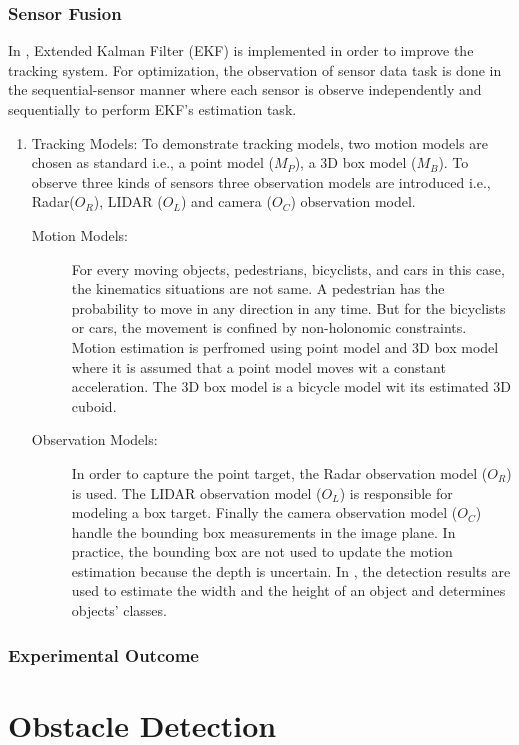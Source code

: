 \subsubsection{Sensor Fusion}
In \cite{Cho_2014}, Extended Kalman Filter (EKF) is implemented in order to improve the tracking system. For optimization, the observation of sensor data task is done in the sequential-sensor manner where each sensor is observe independently and sequentially to perform EKF’s estimation task.
\begin{enumerate}[label=\Alph*]
    \item Tracking Models: To demonstrate tracking models, two motion models are chosen as standard i.e., a point model ($M_{P}$), a 3D box model ($M_{B}$). To observe three kinds of sensors three observation models are introduced i.e., Radar($O_{R}$), LIDAR ($O_{L}$) and camera ($O_{C}$) observation model.
    \begin{description}
        \item[Motion Models:] For every moving objects, pedestrians, bicyclists, and cars in this case, the kinematics situations are not same. A pedestrian has the probability to move in any direction in any time. But for the bicyclists or cars, the movement is confined by non-holonomic constraints\cite{Cho_2014}. Motion estimation is perfromed using point model and 3D box model where it is assumed that a point model moves wit a constant acceleration\cite{Cho_2014}. The 3D box model is a bicycle model wit its estimated 3D cuboid\cite{Cho_2014}.
        \item[Observation Models:] In order to capture the point target, the Radar observation model ($O_{R}$) is used. The LIDAR observation model ($O_{L}$) is responsible for modeling a box target. Finally the camera observation model ($O_{C}$) handle the bounding box measurements in the image plane. In practice, the bounding box are not used to update the motion estimation because the depth is uncertain. In \cite{Cho_2014}, the detection results are used to estimate the width and the height of an object and determines objects’ classes.
    \end{description}
\end{enumerate}


\subsubsection{Experimental Outcome}




\section{Obstacle Detection}

